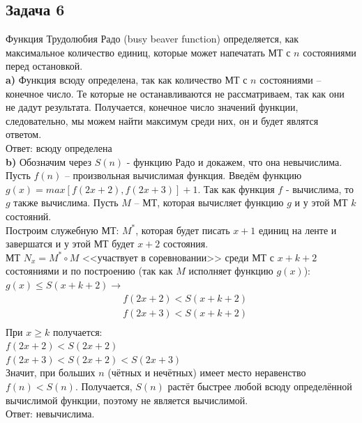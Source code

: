 \documentclass[a4paper,12pt]{article} %
\begin{document}
\subsection*{Задача 6}
Функция Трудолюбия Радо (busy beaver function) определяется, как максимальное количество единиц, которые может напечатать МТ с $n$ состояниями перед остановкой.\\

{\bf a)} Функция всюду определена, так как количество МТ с $ n $ состояниями -- конечное число. Те которые не останавливаются не рассматриваем, так как они не дадут результата. Получается, конечное число значений функции, следовательно, мы можем найти максимум среди них, он и будет являтся ответом.\\
Ответ: всюду определена\\

{\bf b)} Обозначим через $ S(n) $ - функцию Радо и докажем, что она невычислима.\\
Пусть $ f(n) $ -- произвольная вычислимая функция. Введём функцию $ g(x) = max[f(2x+2),f(2x+3)] + 1$. Так как функция $ f $ - вычислима, то $ g $ также вычислима. Пусть $ M $ -- МТ, которая вычисляет функцию $g$ и у этой МТ $ k $ состояний.\\
Построим служебную МТ: $ M^* $, которая будет писать $ x + 1 $ единиц на ленте и завершатся и у этой МТ будет $ x + 2 $ состояния. \\
МТ $ N_x = M^* \circ M $ <<участвует в соревновании>> среди МТ с $ x + k + 2 $ состояниями и по построению (так как $ M $ исполняет функцию $ g(x) $): $ g(x) \leq S(x + k + 2) \longrightarrow $ 
$$
\begin{aligned}
&f(2x + 2) < S(x + k + 2)\\
&f(2x + 3) < S(x + k + 2)\\
\end{aligned}
$$
При $ x \geq k $ получается:\\
$ f(2x + 2) < S(2x + 2) $ \\
$ f(2x + 3) < S(2x + 2) < S(2x + 3)$\\
Значит, при больших $ n $ (чётных и нечётных) имеет место неравенство $ f(n) < S(n) $. Получается, $ S(n) $ растёт быстрее любой всюду определённой вычислимой функции, поэтому не является вычислимой.\\
Ответ: невычислима.
\end{document}
